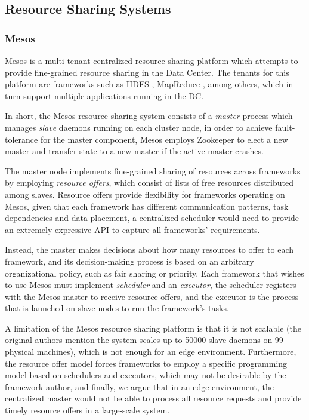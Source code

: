 \subsection{Resource Sharing Systems}

\subsubsection{Mesos}

Mesos \cite{hindman2011mesos} is a multi-tenant centralized resource sharing platform which attempts to provide fine-grained resource sharing in the Data Center. The tenants for this platform are frameworks such as HDFS \cite{borthakur2008hdfs}, MapReduce \cite{dean2008mapreduce}, among others, which in turn support multiple applications running in the DC.

In short, the Mesos resource sharing system consists of a \textit{master} process which manages \textit{slave} daemons running on each cluster node, in order to achieve fault-tolerance for the master component, Mesos employs Zookeeper \cite{hunt2010zookeeper} to elect a new master and transfer state to a new master if the active master crashes.

The master node implements fine-grained sharing of resources across frameworks by employing \textit{resource offers}, which consist of lists of free resources distributed among slaves. Resource offers provide flexibility for frameworks operating on Mesos, given that each framework has different communication patterns, task dependencies and data placement, a centralized scheduler would need to provide an extremely expressive API to capture all frameworks' requirements. 

Instead, the master makes decisions about how many resources to offer to each framework, and its decision-making process is based on an arbitrary organizational policy, such as fair sharing or priority. Each framework that wishes to use Mesos must implement \textit{scheduler} and an \textit{executor}, the scheduler registers with the Mesos master to receive resource offers, and the executor is the process that is launched on slave nodes to run the framework's tasks.

A limitation of the Mesos resource sharing platform is that it is not scalable (the original authors mention the system scales up to 50000 slave daemons on 99 physical machines), which is not enough for an edge environment. Furthermore, the resource offer model forces frameworks to employ a specific programming model based on schedulers and executors, which may not be desirable by the framework author, and finally, we argue that in an edge environment, the centralized master would not be able to process all resource requests and provide timely resource offers in a large-scale system.


